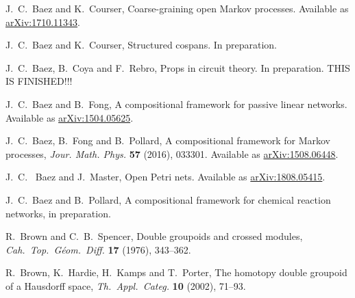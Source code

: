 \documentclass{amsart}
\begin{document}
\begin{thebibliography}{100}

 J.\ C.\ Baez and K.\ Courser, Coarse-graining open Markov processes. Available as \href{https://arxiv.org/abs/1710.11343}{arXiv:1710.11343}.

 J.\ C.\ Baez and K.\ Courser, Structured cospans. In preparation.

 J.\ C.\ Baez, B.\ Coya and F.\ Rebro, Props in circuit theory. In preparation. THIS IS FINISHED!!!

 J.\ C.\ Baez and B.\ Fong, A compositional framework for passive linear networks. Available as \href{http://arxiv.org/abs/1504.05625}{arXiv:1504.05625}.

 J.\ C.\ Baez, B.\ Fong and B.\ Pollard, A compositional framework for Markov processes, \textsl{Jour. Math. Phys.} \textbf{57} (2016), 033301. Available as \href{http://arxiv.org/abs/1508.06448}{arXiv:1508.06448}.

 J.\ C. \ Baez and J.\ Master, Open Petri nets. Available as \href{https://arxiv.org/abs/1808.05415}{arXiv:1808.05415}.

 J.\ C.\ Baez and B.\ Pollard, A compositional framework for chemical reaction networks, in preparation.

 R.\ Brown and C.\ B.\ Spencer, Double groupoids and crossed modules, 
\textsl{Cah.\ Top.\ G\'eom.\ Diff.} \textbf{17} (1976), 343--362.

 R.\ Brown, K.\ Hardie, H.\ Kamps and T.\ Porter, The homotopy double groupoid of a Hausdorff space, \textsl{Th.\ Appl.\ Categ.} \textbf{10} (2002), 71--93.






\end{thebibliography}
\end{document}

